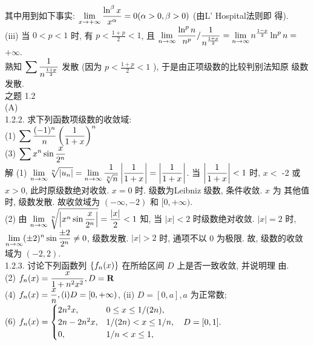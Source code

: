 \documentclass[a4paper,11pt,UTF8]{article}
\begin{document}
其中用到如下事实: $\displaystyle \displaystyle \displaystyle \lim _{x \rightarrow+\infty} \frac{\ln ^\beta x}{x^\alpha}=0(\alpha>0, \beta>0)$ (由L' Hospital法则即 得).\\
(iii) 当 $0<p<1$ 时, 有 $p<\frac{1+p}{2}<1$, 且 $\displaystyle \displaystyle \displaystyle \lim _{n \rightarrow \infty} \frac{\ln ^p n}{n^p} / \frac{1}{n^{\frac{1+p}{2}}}=\lim _{n \rightarrow \infty} n^{\frac{1-p}{2}} \ln ^p n=$ $+\infty$.\\
 熟知 $\displaystyle \displaystyle \displaystyle \sum \frac{1}{n^{\frac{1+p}{2}}}$ 发散 (因为 $p<\frac{1+p}{2}<1$ ), 于是由正项级数的比较判别法知原 级数发散.\\
之题 1.2\\
(A)\\
1.2.2. 求下列函数项级数的收敛域:\\
(1) $\displaystyle \displaystyle \displaystyle \sum \frac{(-1)^n}{n}\left(\frac{1}{1+x}\right)^n$\\
(3) $\displaystyle \displaystyle \displaystyle \sum x^n \sin \frac{x}{2^n}$\\
解 (1) $\displaystyle \displaystyle \displaystyle \lim _{n \rightarrow \infty} \sqrt[n]{\left|u_n\right|}=\lim _{n \rightarrow \infty} \frac{1}{\sqrt[n]{n}}\left|\frac{1}{1+x}\right|=\left|\frac{1}{1+x}\right|$. 当 $\displaystyle \displaystyle \displaystyle \left|\frac{1}{1+x}\right|<1$ 时, $x<$ -2 或 $x>0$, 此时原级数绝对收敛. $x=0$ 时. 级数为Leibniz 级数, 条件收敛. $x$ 为 其他值时, 级数发散. 故收敛域为 $(-\infty,-2)$ 和 $[0,+\infty)$.\\
(2) 由 $\displaystyle \displaystyle \displaystyle \lim _{n \rightarrow \infty} \sqrt[n]{\left|x^n \sin \frac{x}{2^n}\right|}=\frac{|x|}{2}<1$ 知, 当 $|x|<2$ 时级数绝对收敛. $|x|=2$ 时, $\displaystyle \displaystyle \displaystyle \lim _{n \rightarrow \infty}( \pm 2)^n \sin \frac{ \pm 2}{2^n} \neq 0$, 级数发散. $|x|>2$ 时, 通项不以 0 为极限. 故, 级数的收敛 域为 $(-2,2)$.\\
1.2.3. 讨论下列函数列 $\displaystyle \displaystyle \displaystyle \left\{f_n(x)\right\}$ 在所给区间 $D$ 上是否一致收敛, 并说明理 由.\\
(2) $\displaystyle \displaystyle \displaystyle f_n(x)=\frac{x}{1+n^2 x^2}, D=\mathbf{R}$\\
(4) $\displaystyle \displaystyle \displaystyle f_n(x)=\frac{x}{n},(\text{i}) D=[0,+\infty)$, (ii) $D=[0, a], a$ 为正常数;\\
(6) $\displaystyle \displaystyle \displaystyle f_n(x)= \begin{cases}2 n^2 x, & 0 \leq x \leq 1 /(2 n), \\2 n-2 n^2 x, & 1 /(2 n)<x \leq 1 / n, \quad D=[0,1] . \\0, & 1 / n<x \leq 1,\end{cases}$\\
\end{document}
